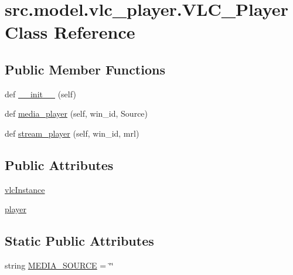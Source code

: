\hypertarget{classsrc_1_1model_1_1vlc__player_1_1VLC__Player}{}\section{src.\+model.\+vlc\+\_\+player.\+V\+L\+C\+\_\+\+Player Class Reference}
\label{classsrc_1_1model_1_1vlc__player_1_1VLC__Player}
\subsection*{Public Member Functions}
\begin{DoxyCompactItemize}
\item 
def \hyperlink{classsrc_1_1model_1_1vlc__player_1_1VLC__Player_ab09b2cb2fbf9f42eb230b76f9d4d2118}{\+\_\+\+\_\+init\+\_\+\+\_\+} (self)
\item 
def \hyperlink{classsrc_1_1model_1_1vlc__player_1_1VLC__Player_a27a50c4399258098ac47e2e2b5d7521e}{media\+\_\+player} (self, win\+\_\+id, Source)
\item 
def \hyperlink{classsrc_1_1model_1_1vlc__player_1_1VLC__Player_a91bfb17633c591cdb9311af985fa8366}{stream\+\_\+player} (self, win\+\_\+id, mrl)
\end{DoxyCompactItemize}
\subsection*{Public Attributes}
\begin{DoxyCompactItemize}
\item 
\hyperlink{classsrc_1_1model_1_1vlc__player_1_1VLC__Player_a1a219abbd53bd508fcc8784ff300a3bd}{vlc\+Instance}
\item 
\hyperlink{classsrc_1_1model_1_1vlc__player_1_1VLC__Player_a589585abc542dbde1e3c3a9d94384875}{player}
\end{DoxyCompactItemize}
\subsection*{Static Public Attributes}
\begin{DoxyCompactItemize}
\item 
string \hyperlink{classsrc_1_1model_1_1vlc__player_1_1VLC__Player_ae218983da86ed762827885423785dab6}{M\+E\+D\+I\+A\+\_\+\+S\+O\+U\+R\+C\+E} = \char`\"{}\char`\"{}
\end{DoxyCompactItemize}
